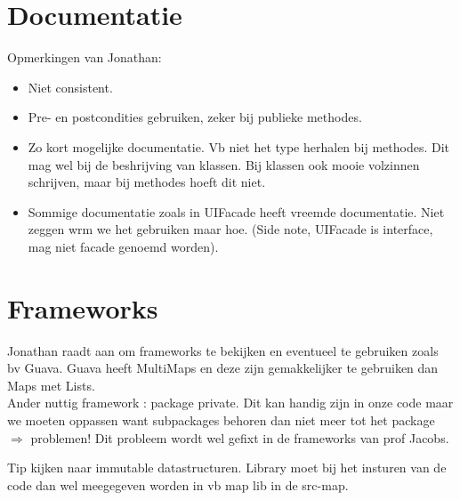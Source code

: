 \documentclass[DIV=calc,11pt ]{scrartcl}
\begin{document}
\section{Documentatie}
Opmerkingen van Jonathan:
\begin{itemize}
\item Niet consistent.
\item Pre- en postcondities gebruiken, zeker bij publieke methodes.
\item Zo kort mogelijke documentatie. Vb niet het type herhalen bij methodes. Dit mag wel bij de beshrijving van klassen. Bij klassen ook mooie volzinnen schrijven, maar bij methodes hoeft dit niet.
\item Sommige documentatie zoals in UIFacade heeft vreemde documentatie. Niet zeggen wrm we het gebruiken maar hoe. (Side note, UIFacade is interface, mag niet facade genoemd worden).
\end{itemize}

\section{Frameworks}
\label{Frameworks}
Jonathan raadt aan om frameworks te bekijken en eventueel te gebruiken zoals bv Guava. Guava heeft MultiMaps en deze zijn gemakkelijker te gebruiken dan Maps met Lists.\\
Ander nuttig framework : package private. Dit kan handig zijn in onze code maar we moeten oppassen want subpackages behoren dan niet meer tot het package $\Rightarrow$ problemen! Dit probleem wordt wel gefixt in de frameworks van prof Jacobs.

Tip kijken naar immutable datastructuren. Library moet bij het insturen van de code dan wel meegegeven worden in vb map lib in de src-map.
\end{document}
